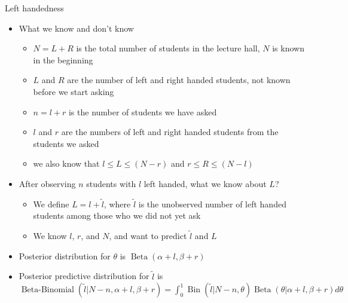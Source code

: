 \documentclass[english,t]{beamer}
\DeclareMathOperator{\Bin}{Bin}
\DeclareMathOperator{\Beta}{Beta}
\DeclareMathOperator{\BetaBinomial}{Beta-Binomial}
\begin{document}
\begin{frame}{Left handedness}

  \vspace{-0.5\baselineskip}
  \begin{itemize}
  \item<+-> What we know and don't know
    \begin{itemize}
    \item $N=L+R$ is the total number of students in the lecture hall,
      $N$ is known in the beginning
    \item<+-> $L$ and $R$ are the number of left and right handed students, not known before we start asking
    \item<+-> $n=l+r$ is the number of students we have asked
    \item<+-> $l$ and $r$ are the numbers of left and right handed students from the students we asked
    \item<+-> we also know that $l \leq L \leq (N-r)$ and $r \leq R \leq (N-l)$
    \end{itemize}
  \item<+-> After observing $n$ students with $l$ left handed, what we
    know about $L$?
    \begin{itemize}
    \item We define $L=l+\tilde{l}$, where $\tilde{l}$ is the
      unobserved number of left handed students among those who we did
      not yet ask
    \item We know $l$, $r$, and $N$, and want to predict $\tilde{l}$ and $L$
    \end{itemize}
  \item<+-> {\color{blue} Posterior} distribution for
    $\theta$ is $\Beta(\alpha+l, \beta+r)$
  \item<+-> {\color{red} Posterior predictive} distribution for
    $\displaystyle\tilde{l}$ is\\
    $\BetaBinomial(\tilde{l} | N-n, \alpha+l, \beta+r)=\int_0^1\Bin(\tilde{l} | N-n, \theta)\Beta(\theta | \alpha+l, \beta+r)d\theta$
  \end{itemize}
  
\end{frame}

\end{document}
